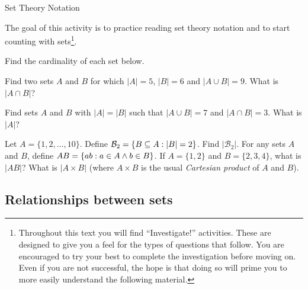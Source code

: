 \documentclass[12pt]{article}
\begin{document}
\begin{defbox}{Set Theory Notation}
\end{defbox}


\begin{activity}
The goal of this activity is to practice reading set theory notation and to start counting with sets\footnote{Throughout this text you will find ``Investigate!'' activities.  These are designed to give you a feel for the types of questions that follow.  You are encouraged to try your best to complete the investigation before moving on.  Even if you are not successful, the hope is that doing so will prime you to more easily understand the following material.}. 
\begin{questions}
\question Find the cardinality of each set below.

\question Find two sets $A$ and $B$ for which $|A| = 5$, $|B| = 6$ and $|A\cup B| = 9$.  What is $|A \cap B|$? 

\question Find sets $A$ and $B$ with $|A| = |B|$ such that $|A\cup B| = 7$ and $|A \cap B| = 3$.  What is $|A|$?

\question Let $A = \{1,2,\ldots, 10\}$.  Define $\mathcal{B}_2 = \{B \subseteq A : |B| = 2\}$.  Find $|\mathcal{B}_2|$.
\question For any sets $A$ and $B$, define $AB = \{ab : a\in A \wedge b \in B\}$.  If $A = \{1,2\}$ and $B = \{2,3,4\}$, what is $|AB|$?  What is $|A \times B|$ (where $A \times B$ is the usual {\em Cartesian product} of $A$ and $B$). 
\end{questions}

\end{activity}



\subsection{Relationships between sets}
\end{document}
